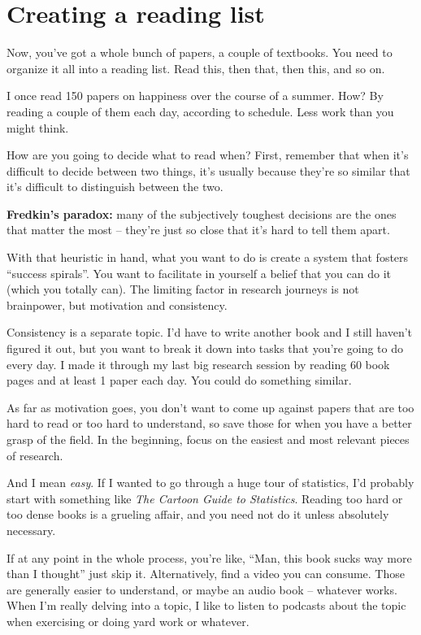 \section{Creating a reading list}

Now, you've got a whole bunch of papers, a couple of textbooks. You need to
organize it all into a reading list. Read this, then that, then this, and so on.

I once read 150 papers on happiness over the course of a summer. How? By reading
a couple of them each day, according to schedule. Less work than you might
think.

 How are you going to decide what to read when? First, remember that
when it's difficult to decide between two things, it's usually because they're
so similar that it's difficult to distinguish between the two.

\textbf{Fredkin's paradox:} many of the subjectively toughest decisions are the ones that
matter the most -- they're just so close that it's hard to tell them apart. 

With that heuristic in hand, what you want to do is create a system that fosters ``success spirals''. You want to facilitate in yourself a belief that you can do it (which
you totally can). The limiting factor in research journeys is not brainpower, but motivation and consistency.

Consistency is a separate topic. I'd have to write another book and I still
haven't figured it out, but you want to break it down into tasks that you're
going to do every day. I made it through my last big research session by
reading 60 book pages and at least 1 paper each day. You could do something similar.

As far as motivation goes, you don't want to come up against
papers that are too hard to read or too hard to understand, so save those for
when you have a better grasp of the field. In the beginning, focus on the
easiest and most relevant pieces of research.

And I mean \textit{easy}. If I wanted to go through a huge tour of statistics,
I'd probably start with something like \textit{The Cartoon Guide to
  Statistics}. Reading too hard or too dense books is a grueling affair, and you
need not do it unless absolutely necessary.

If at any point in the whole process, you're like, ``Man, this book sucks way
more than I thought'' just skip it. Alternatively, find a video you can
consume. Those are generally easier to understand, or maybe an audio book -- whatever works. When I'm really delving into a topic, I
like to listen to podcasts about the topic when exercising or doing yard work or whatever.

